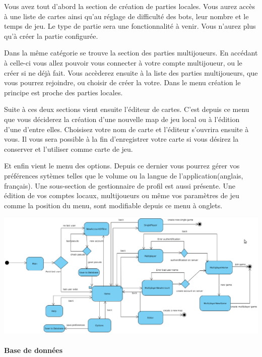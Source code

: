 \documentclass[a4paper,11pt]{report}
\begin{document}
		Vous avez tout d'abord la section de création de parties locales. Vous aurez
		accès à une liste de cartes ainsi qu'au réglage de difficulté des bots, leur
		nombre et le temps de jeu. Le type de partie sera une fonctionnalité à venir.
		Vous n'aurez plus qu'à créer la partie configurée.
		
		Dans la même catégorie se trouve la section des parties multijoueurs. En
		accédant à celle-ci vous allez pouvoir vous connecter à votre compte
		multijoueur, ou le créer si ne déjà fait. Vous accèderez ensuite à la liste
		des parties multijoueurs, que vous pourrez rejoindre, ou choisir de créer la
		votre. Dans le menu création le principe est proche des parties locales.
		
		Suite à ces deux sections vient ensuite l'éditeur de cartes. C'est depuis ce
		menu que vous déciderez la création d'une nouvelle map de jeu local ou à
		l'édition d'une d'entre elles. Choisisez votre nom de carte et l'éditeur
		s'ouvrira ensuite à vous. Il vous sera possible à la fin d'enregistrer votre
		carte si vous désirez la conserver et l'utiliser comme carte de jeu.
		
		Et enfin vient le menu des options. Depuis ce dernier vous pourrez gérer vos
		préférences sytèmes telles que le volume ou la langue de
		l'application(anglais, français).
		Une sous-section de gestionnaire de profil
		est aussi présente. Une édition de vos comptes locaux, multijoueurs ou même
		vos paramètres de jeu comme la position du menu, sont modifiable depuis ce
		menu à onglets.
		
		\begin{center}
			\label{activité}
			\includegraphics[width=23cm, angle=90]{./diagrammes/diag_activity.eps}
		\end{center}

				\paragraph{Base de données\\}
				
\end{document}
